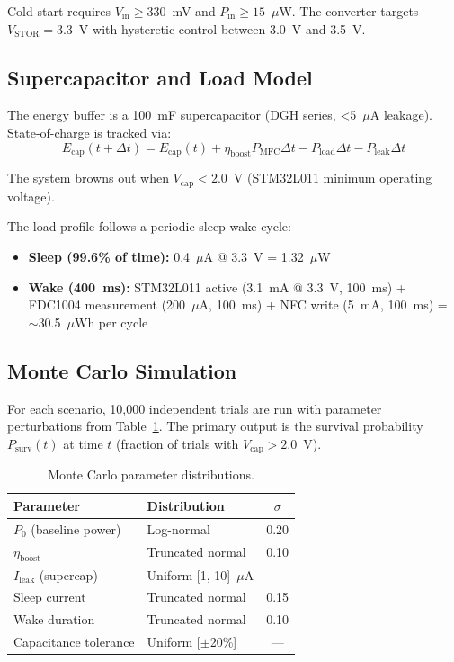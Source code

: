 \documentclass[twocolumn,10pt,a4paper]{article}
\begin{document}
Cold-start requires $V_{\text{in}} \geq 330$~mV and $P_{\text{in}} \geq
15$~$\mu$W. The converter targets $V_{\text{STOR}} = 3.3$~V with hysteretic
control between 3.0~V and 3.5~V.

\subsection{Supercapacitor and Load Model}

The energy buffer is a 100~mF supercapacitor (DGH series, \textless 5~$\mu$A
leakage). State-of-charge is tracked via:
\begin{equation}
E_{\text{cap}}(t+\Delta t) = E_{\text{cap}}(t) + \eta_{\text{boost}} P_{\text{MFC}}\Delta t
    - P_{\text{load}}\Delta t - P_{\text{leak}}\Delta t
\label{eq:energy}
\end{equation}

The system browns out when $V_{\text{cap}} < 2.0$~V (STM32L011 minimum
operating voltage).

The load profile follows a periodic sleep-wake cycle:
\begin{itemize}
    \item \textbf{Sleep (99.6\% of time):} 0.4~$\mu$A @ 3.3~V = 1.32~$\mu$W
    \item \textbf{Wake (400~ms):} STM32L011 active (3.1~mA @ 3.3~V, 100~ms)
          + FDC1004 measurement (200~$\mu$A, 100~ms) + NFC write (5~mA, 100~ms)
          = $\sim$30.5~$\mu$Wh per cycle
\end{itemize}

\subsection{Monte Carlo Simulation}

For each scenario, 10,000 independent trials are run with parameter
perturbations from Table~\ref{tab:params}. The primary output is the
survival probability $P_{\text{surv}}(t)$ at time $t$ (fraction of trials
with $V_{\text{cap}} > 2.0$~V).

\begin{table}[H]
\centering
\caption{Monte Carlo parameter distributions.}
\label{tab:params}
\begin{tabular}{llc}
\toprule
Parameter & Distribution & $\sigma$ \\
\midrule
$P_0$ (baseline power) & Log-normal & 0.20 \\
$\eta_{\text{boost}}$ & Truncated normal & 0.10 \\
$I_{\text{leak}}$ (supercap) & Uniform [1, 10]~$\mu$A & — \\
Sleep current & Truncated normal & 0.15 \\
Wake duration & Truncated normal & 0.10 \\
Capacitance tolerance & Uniform [$\pm$20\%] & — \\
\bottomrule
\end{tabular}
\end{table}
\end{document}
